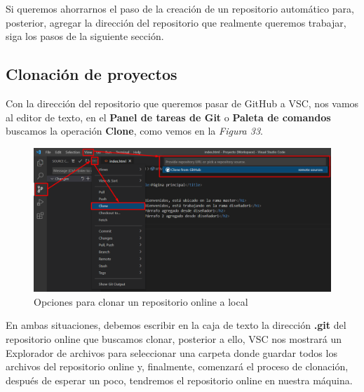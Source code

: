 Si queremos ahorrarnos el paso de la creación de un repositorio automático para, posterior, agregar la dirección del repositorio que realmente queremos trabajar, siga los pasos de la siguiente sección.



\subsection{Clonación de proyectos}
\hspace{0.55cm}Con la dirección del repositorio que queremos pasar de GitHub a VSC, nos vamos al editor de texto, en el \textbf{Panel de tareas de Git} o \textbf{Paleta de comandos} buscamos la operación \textbf{Clone}, como vemos en la \textit{Figura 33}.
\begin{figure}[H]
    \begin{center}
        \caption{Opciones para clonar un repositorio online a local}
        \label{fig: 33}
        \includegraphics[width=14cm]{capturas/clone.png}
    \end{center}
\end{figure}

En ambas situaciones, debemos escribir en la caja de texto la dirección \textbf{.git} del repositorio online que buscamos clonar, posterior a ello, VSC nos mostrará un Explorador de archivos para seleccionar una carpeta donde guardar todos los archivos del repositorio online y, finalmente, comenzará el proceso de clonación, después de esperar un poco, tendremos el repositorio online en nuestra máquina.





